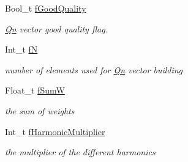 \begin{DoxyCompactItemize}
\mbox{\label{classQn_1_1CorrectionQnVector_a368a0eb951505630ae8ba7d85e46671c}} 
Bool\+\_\+t \mbox{\hyperlink{classQn_1_1CorrectionQnVector_a368a0eb951505630ae8ba7d85e46671c}{f\+Good\+Quality}}
\begin{DoxyCompactList}\small\item\em \mbox{\hyperlink{namespaceQn}{Qn}} vector good quality flag. \end{DoxyCompactList}\item 
\mbox{\label{classQn_1_1CorrectionQnVector_a66810d5fcac23b630b40c673a6804b26}} 
Int\+\_\+t \mbox{\hyperlink{classQn_1_1CorrectionQnVector_a66810d5fcac23b630b40c673a6804b26}{fN}}
\begin{DoxyCompactList}\small\item\em number of elements used for \mbox{\hyperlink{namespaceQn}{Qn}} vector building \end{DoxyCompactList}\item 
\mbox{\label{classQn_1_1CorrectionQnVector_ac85bb3bbe9a52f15ad330fe59724f0f8}} 
Float\+\_\+t \mbox{\hyperlink{classQn_1_1CorrectionQnVector_ac85bb3bbe9a52f15ad330fe59724f0f8}{f\+SumW}}
\begin{DoxyCompactList}\small\item\em the sum of weights \end{DoxyCompactList}\item 
\mbox{\label{classQn_1_1CorrectionQnVector_afeff0835afa33a26d719f1af506ea4b1}} 
Int\+\_\+t \mbox{\hyperlink{classQn_1_1CorrectionQnVector_afeff0835afa33a26d719f1af506ea4b1}{f\+Harmonic\+Multiplier}}
\begin{DoxyCompactList}\small\item\em the multiplier of the different harmonics \end{DoxyCompactList}\end{DoxyCompactItemize}
